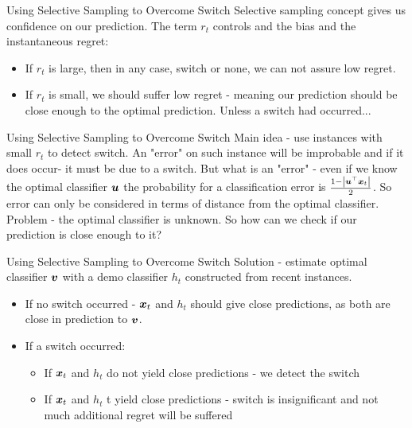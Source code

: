\documentclass{beamer}
\begin{document}
\begin{frame}{Using Selective Sampling to Overcome Switch}
Selective sampling concept gives us confidence on our prediction.\newline
\newline
The term $r_t$ controls and the bias and the instantaneous regret:
\begin{itemize}
\item If $r_t$ is large, then in any case, switch or none, we can not assure low regret.
\item If $r_t$ is small, we should suffer low regret - meaning our prediction should be close enough to the optimal prediction. Unless a switch had occurred...
\end{itemize}
\end{frame}

\begin{frame}{Using Selective Sampling to Overcome Switch}
Main idea - use instances with small $r_t$ to detect switch. An "error" on such instance will be improbable and if it does occur- it must be due to a switch.\newline
\newline
But what is an "error" - even if we know the optimal classifier ${\boldsymbol{u}}$ the probability for a classification error is $\frac{1-\left|{{\boldsymbol{u}}}^{\top}{\boldsymbol{x}}_{t}\right|}{2}$. So error can only be considered in terms of distance from the optimal classifier.
\newline
\newline
Problem - the optimal classifier is unknown. So how can we check if our prediction is close enough to it?

\end{frame}

\begin{frame}{Using Selective Sampling to Overcome Switch}
Solution - estimate optimal classifier ${\boldsymbol{v}}$ with a demo classifier $h_t$ constructed from recent instances.\newline
\begin{itemize}
\item If no switch occurred - ${\boldsymbol{x}}_{t}$ and $h_t$ should give close predictions, as both are close in prediction to ${\boldsymbol{v}}$.
\newline
\item If a switch occurred:
\begin{itemize}
\item If ${\boldsymbol{x}}_{t}$ and $h_t$ do not yield close predictions - we detect the switch
\item If ${\boldsymbol{x}}_{t}$ and $h_t$ t yield close predictions -  switch is insignificant and not much additional regret will be suffered
\end{itemize}
\end{itemize}
\end{frame}
\end{document}
